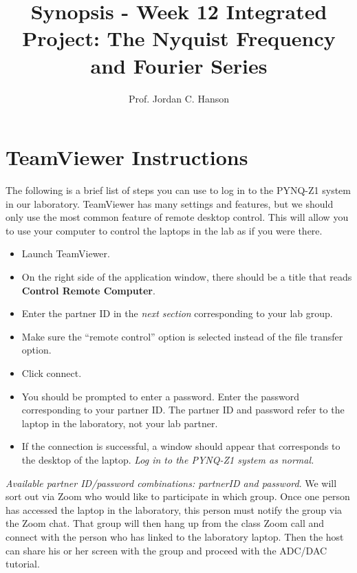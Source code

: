 \documentclass{article}
\begin{document}
\title{Synopsis - Week 12 Integrated Project: The Nyquist Frequency and Fourier Series}
\author{Prof. Jordan C. Hanson}

\maketitle

\section{TeamViewer Instructions}

The following is a brief list of steps you can use to log in to the PYNQ-Z1 system in our laboratory.  TeamViewer has many settings and features, but we should only use the most common feature of remote desktop control.  This will allow you to use your computer to control the laptops in the lab as if you were there.

\begin{itemize}
\item Launch TeamViewer.
\item On the right side of the application window, there should be a title that reads \textbf{Control Remote Computer}.
\item Enter the partner ID in the \textit{next section} corresponding to your lab group.
\item Make sure the ``remote control'' option is selected instead of the file transfer option.
\item Click connect.
\item You should be prompted to enter a password.  Enter the password corresponding to your partner ID.  The partner ID and password refer to the laptop in the laboratory, not your lab partner.
\item If the connection is successful, a window should appear that corresponds to the desktop of the laptop.  \textit{Log in to the PYNQ-Z1 system as normal.}  
\end{itemize}

\textit{Available partner ID/password combinations: partnerID and password}.  We will sort out via Zoom who would like to participate in which group.  Once one person has accessed the laptop in the laboratory, this person must notify the group via the Zoom chat.  That group will then hang up from the class Zoom call and connect with the person who has linked to the laboratory laptop.  Then the host can share his or her screen with the group and proceed with the ADC/DAC tutorial.
\end{document}
